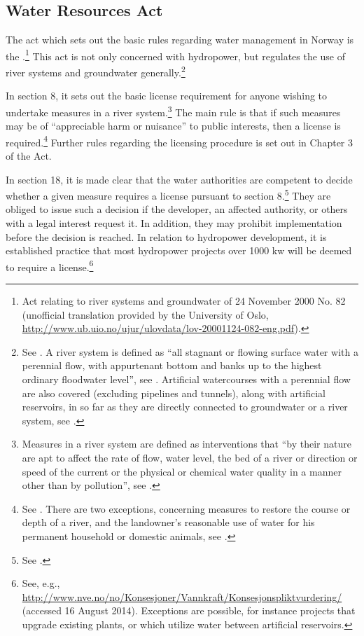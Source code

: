 \subsection{Water Resources Act}

The act which sets out the basic rules regarding water management in Norway is the \cite{wra00}.\footnote{Act relating to river systems and groundwater of 24 November 2000 No. 82 (unofficial translation provided by the University of Oslo, \url{http://www.ub.uio.no/ujur/ulovdata/lov-20001124-082-eng.pdf}).} This act is not only concerned with hydropower, but regulates the use of river systems and groundwater generally.\footnote{See \cite[1]{wra00}. A river system is defined as ``all stagnant or flowing surface water with a perennial flow, with appurtenant bottom and banks up to the highest ordinary floodwater level'', see \cite[2]{wra00}. Artificial watercourses with a perennial flow are also covered (excluding pipelines and tunnels), along with artificial reservoirs, in so far as they are directly connected to groundwater or a river system, see \cite[2a-2b]{wra00}.} 

In section 8, it sets out the basic license requirement for anyone wishing to undertake measures in a river system.\footnote{Measures in a river system are defined as interventions that ``by their nature are apt to affect the rate of flow, water level, the bed of a river or direction or speed of the current or the physical or chemical water quality in a manner other than by pollution'', see \cite[3a]{wra00}.} The main rule is that if such measures may be of ``appreciable harm or nuisance''  to public interests, then a license is required.\footnote{See \cite[8]{wra00}. There are two exceptions, concerning measures to restore the course or depth of a river, and the landowner's reasonable use of water for his permanent household or domestic animals, see \cite[12|15]{wra00}.} Further rules regarding the licensing procedure is set out in Chapter 3 of the Act. 

In section 18, it is made clear that the water authorities are competent to decide whether a given measure requires a license pursuant to section 8.\footnote{See \cite[18]{wra00}.}  They are obliged to issue such a decision if the developer, an affected authority, or others with a legal interest request it. In addition, they may prohibit implementation before the decision is reached. In relation to hydropower development, it is established practice that most hydropower projects over 1000 kw will be deemed to require a license.\footnote{See, e.g., \url{http://www.nve.no/no/Konsesjoner/Vannkraft/Konsesjonspliktvurdering/} (accessed 16 August 2014). Exceptions are possible, for instance projects that upgrade existing plants, or which utilize water between artificial reservoirs.}

